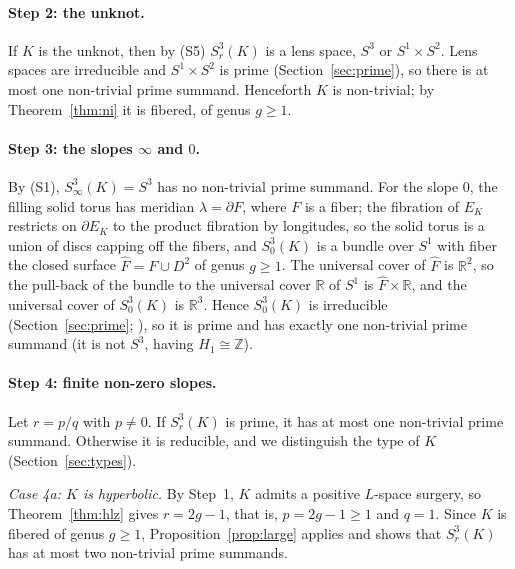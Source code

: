 \documentclass[11pt]{article}
\newcommand{\Z}{\mathbb Z}
\newcommand{\R}{\mathbb R}
\newcommand{\Surg}[2]{S^3_{#1}(#2)}
\theoremstyle{definition}
\theoremstyle{remark}
\begin{document}

\paragraph{Step 2: the unknot.}
If \(K\) is the unknot, then by (S5) \(\Surg{r}{K}\) is a lens space,
\(S^3\) or \(S^1\times S^2\). Lens spaces are irreducible and
\(S^1\times S^2\) is prime (Section~\ref{sec:prime}), so there is at most
one non-trivial prime summand. Henceforth \(K\) is non-trivial; by
Theorem~\ref{thm:ni} it is fibered, of genus \(g\geq1\).

\paragraph{Step 3: the slopes \(\infty\) and \(0\).}
By (S1), \(\Surg{\infty}{K}=S^3\) has no non-trivial prime summand. For
the slope \(0\), the filling solid torus has meridian \(\lambda=\partial F\),
where \(F\) is a fiber; the fibration of \(E_K\) restricts on
\(\partial E_K\) to the product fibration by longitudes, so the solid
torus is a union of discs capping off the fibers, and \(\Surg{0}{K}\) is a
bundle over \(S^1\) with fiber the closed surface \(\widehat F=F\cup D^2\)
of genus \(g\geq1\). The universal cover of \(\widehat F\) is \(\R^2\),
so the pull-back of the bundle to the universal cover \(\R\) of \(S^1\)
is \(\widehat F\times\R\), and the universal cover of \(\Surg{0}{K}\) is
\(\R^3\). Hence \(\Surg{0}{K}\) is irreducible (Section~\ref{sec:prime};
\cite[Proposition~1.6]{Hatcher3M}), so it is prime and has exactly one
non-trivial prime summand (it is not \(S^3\), having \(H_1\cong\Z\)).

\paragraph{Step 4: finite non-zero slopes.}
Let \(r=p/q\) with \(p\neq0\). If \(\Surg{r}{K}\) is prime, it has at most
one non-trivial prime summand. Otherwise it is reducible, and we
distinguish the type of \(K\) (Section~\ref{sec:types}).

\emph{Case 4a: \(K\) is hyperbolic.} By Step~1, \(K\) admits a positive
\(L\)-space surgery, so Theorem~\ref{thm:hlz} gives \(r=2g-1\), that is,
\(p=2g-1\geq1\) and \(q=1\). Since \(K\) is fibered of genus \(g\geq1\),
Proposition~\ref{prop:large} applies and shows that \(\Surg{r}{K}\) has at
most two non-trivial prime summands.
\end{document}
